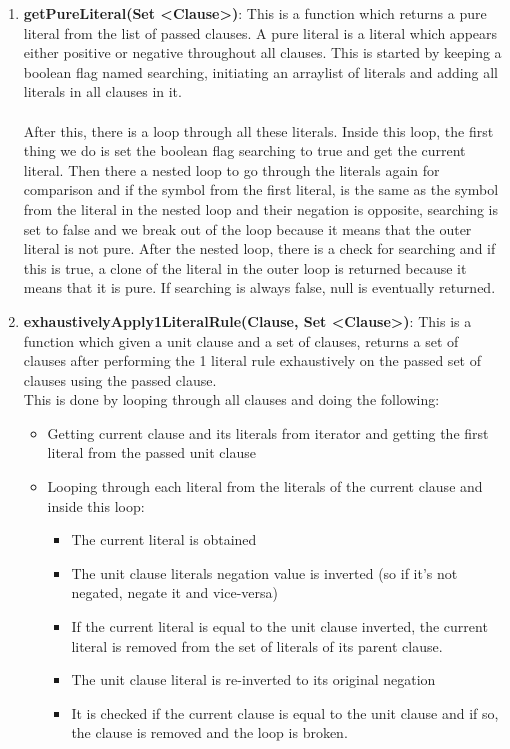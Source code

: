 \documentclass{article}
\begin{document}
\begin{enumerate}
		\item \textbf{getPureLiteral(Set \textless Clause\textgreater)}: This is a function which returns a pure literal from the list of passed clauses. A pure literal is a literal which appears either positive or negative throughout all clauses. This is started by keeping a boolean flag named searching, initiating an arraylist of literals and adding all literals in all clauses in it. \\\\
		After this, there is a loop through all these literals. Inside this loop, the first thing we do is set the boolean flag searching to true and get the current literal. Then there a nested loop to go through the literals again for comparison and if the symbol from the first literal, is the same as the symbol from the literal in the nested loop and their negation is opposite, searching is set to false and we break out of the loop because it means that the outer literal is not pure. After the nested loop, there is a check for searching and if this is true, a clone of the literal in the outer loop is returned because it means that it is pure. If searching is always false, null is eventually returned.
		
				\item \textbf{exhaustivelyApply1LiteralRule(Clause, Set \textless Clause\textgreater)}: This is a function which given a unit clause and a set of clauses, returns a set of clauses after performing the 1 literal rule exhaustively on the passed set of clauses using the passed clause. \\
				
				This is done by looping through all clauses and doing the following:
				\begin{itemize}
				\item Getting current clause and its literals from iterator and getting the first literal from the passed unit clause
				\item Looping through each literal from the literals of the current clause and inside this loop:
					\begin{itemize}
						\item The current literal is obtained
						\item The unit clause literals negation value is inverted (so if it's not negated, negate it and vice-versa)
						\item If the current literal is equal to the unit clause inverted, the current literal is removed from the set of literals of its parent clause.
						\item The unit clause literal is re-inverted to its original negation
						\item It is checked if the current clause is equal to the unit clause and if so, the clause is removed and the loop is broken.


\end{itemize}
\end{itemize}
\end{enumerate}
\end{document}
